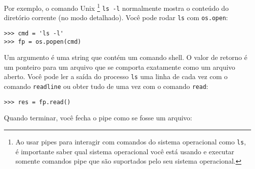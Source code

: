 Por exemplo, o comando Unix \footnote{Ao usar pipes para interagir com comandos do sistema operacional como {\tt ls},
é importante saber qual sistema operacional você está usando e executar somente comandos pipe que
são suportados pelo seu sistema operacional.}
{\tt ls -l} normalmente mostra o conteúdo do diretório corrente (no modo detalhado). 
Você pode rodar {\tt ls} com {\tt os.open}:


\beforeverb
\begin{verbatim}
>>> cmd = 'ls -l'
>>> fp = os.popen(cmd)
\end{verbatim}
\afterverb

Um argumento é uma string que contém um comando shell. O
valor de retorno é um ponteiro para um arquivo que se comporta exatamente como um arquivo
aberto. Você pode ler a saída do processo {\tt ls} uma
linha de cada vez com o comando {\tt readline} ou obter tudo de uma vez com o comando {\tt read}:


\beforeverb
\begin{verbatim}
>>> res = fp.read()
\end{verbatim}
\afterverb

Quando terminar, você fecha o pipe como se fosse um arquivo:

